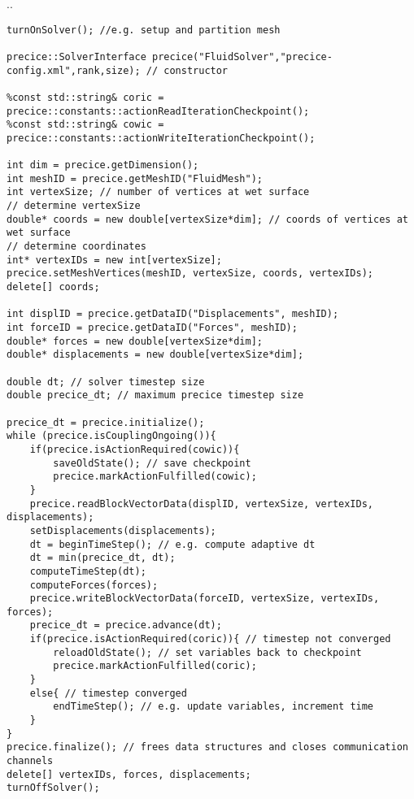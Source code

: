 ..




\lstset{language=C++}
\begin{lstlisting}[caption=preCICE adapter structure]
turnOnSolver(); //e.g. setup and partition mesh 

precice::SolverInterface precice("FluidSolver","precice-config.xml",rank,size); // constructor

%const std::string& coric = precice::constants::actionReadIterationCheckpoint(); 
%const std::string& cowic = precice::constants::actionWriteIterationCheckpoint();

int dim = precice.getDimension();
int meshID = precice.getMeshID("FluidMesh");
int vertexSize; // number of vertices at wet surface 
// determine vertexSize
double* coords = new double[vertexSize*dim]; // coords of vertices at wet surface 
// determine coordinates
int* vertexIDs = new int[vertexSize];
precice.setMeshVertices(meshID, vertexSize, coords, vertexIDs); 
delete[] coords;

int displID = precice.getDataID("Displacements", meshID); 
int forceID = precice.getDataID("Forces", meshID); 
double* forces = new double[vertexSize*dim];
double* displacements = new double[vertexSize*dim];

double dt; // solver timestep size
double precice_dt; // maximum precice timestep size

precice_dt = precice.initialize();
while (precice.isCouplingOngoing()){
	if(precice.isActionRequired(cowic)){
		saveOldState(); // save checkpoint
		precice.markActionFulfilled(cowic);
	}
	precice.readBlockVectorData(displID, vertexSize, vertexIDs, displacements);
	setDisplacements(displacements);
	dt = beginTimeStep(); // e.g. compute adaptive dt 
	dt = min(precice_dt, dt);
	computeTimeStep(dt);
	computeForces(forces);
	precice.writeBlockVectorData(forceID, vertexSize, vertexIDs, forces);
	precice_dt = precice.advance(dt);
	if(precice.isActionRequired(coric)){ // timestep not converged
		reloadOldState(); // set variables back to checkpoint
		precice.markActionFulfilled(coric);
	}
	else{ // timestep converged
		endTimeStep(); // e.g. update variables, increment time
	}
}
precice.finalize(); // frees data structures and closes communication channels
delete[] vertexIDs, forces, displacements;
turnOffSolver();
\end{lstlisting}
